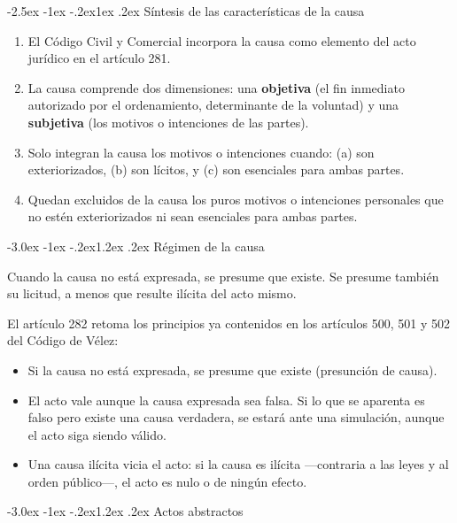 \documentclass[12pt,oneside]{book}
\makeatletter
\renewcommand\section{\@startsection{section}{1}{\z@}%
  {-3.0ex \@plus -1ex \@minus -.2ex}{1.2ex \@plus .2ex}%
  {\normalfont\large\bfseries\color{acento}}}
\renewcommand\subsection{\@startsection{subsection}{2}{\z@}%
  {-2.5ex \@plus -1ex \@minus -.2ex}{1ex \@plus .2ex}%
  {\normalfont\normalsize\bfseries}}
\makeatother
\begin{document}
\subsection{Síntesis de las características de la causa}

\begin{enumerate}
    \item El Código Civil y Comercial incorpora la causa como elemento del acto jurídico en el artículo 281.
    \item La causa comprende dos dimensiones: una \textbf{objetiva} (el fin inmediato autorizado por el ordenamiento, determinante de la voluntad) y una \textbf{subjetiva} (los motivos o intenciones de las partes).
    \item Solo integran la causa los motivos o intenciones cuando: (a) son exteriorizados, (b) son lícitos, y (c) son esenciales para ambas partes.
    \item Quedan excluidos de la causa los puros motivos o intenciones personales que no estén exteriorizados ni sean esenciales para ambas partes.
\end{enumerate}

\section{Régimen de la causa}

\begin{definicion}
Cuando la causa no está expresada, se presume que existe. Se presume también su licitud, a menos que resulte ilícita del acto mismo.
\end{definicion}

El artículo 282 retoma los principios ya contenidos en los artículos 500, 501 y 502 del Código de Vélez:

\begin{itemize}
    \item Si la causa no está expresada, se presume que existe (presunción de causa).
    \item El acto vale aunque la causa expresada sea falsa. Si lo que se aparenta es falso pero existe una causa verdadera, se estará ante una simulación, aunque el acto siga siendo válido.
    \item Una causa ilícita vicia el acto: si la causa es ilícita ---contraria a las leyes y al orden público---, el acto es nulo o de ningún efecto.
\end{itemize}

\section{Actos abstractos}
\end{document}
